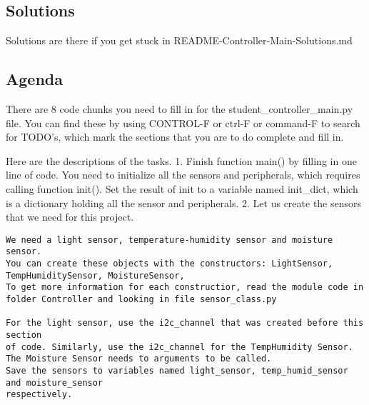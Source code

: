 \documentclass[
]{article}
\begin{document}
\hypertarget{solutions}{%
\subsection{Solutions}\label{solutions}}

Solutions are there if you get stuck in
README-Controller-Main-Solutions.md

\hypertarget{agenda}{%
\subsection{Agenda}\label{agenda}}

There are 8 code chunks you need to fill in for the
student\_controller\_main.py file. You can find these by using CONTROL-F
or ctrl-F or command-F to search for TODO's, which mark the sections
that you are to do complete and fill in.

Here are the descriptions of the tasks. 1. Finish function main() by
filling in one line of code. You need to initialize all the sensors and
peripherals, which requires calling function init(). Set the result of
init to a variable named init\_dict, which is a dictionary holding all
the sensor and peripherals. 2. Let us create the sensors that we need
for this project.

\begin{verbatim}
We need a light sensor, temperature-humidity sensor and moisture sensor.
You can create these objects with the constructors: LightSensor, TempHumiditySensor, MoistureSensor,
To get more information for each constructior, read the module code in
folder Controller and looking in file sensor_class.py

For the light sensor, use the i2c_channel that was created before this section
of code. Similarly, use the i2c_channel for the TempHumidity Sensor.
The Moisture Sensor needs to arguments to be called.
Save the sensors to variables named light_sensor, temp_humid_sensor and moisture_sensor
respectively.
\end{verbatim}
\end{document}
